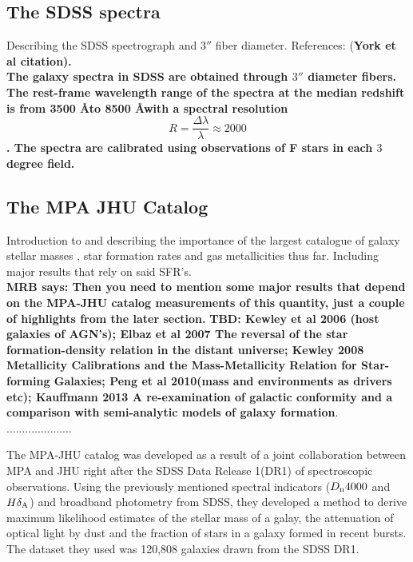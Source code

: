 \subsection{The SDSS spectra}
Describing the SDSS spectrograph and $3''$ fiber diameter. References: \citep{smee_multi-object_2013} (\bf York et al citation).\\
The galaxy spectra in SDSS are obtained through $3''$ diameter fibers. The rest-frame wavelength range of the spectra at the median redshift is from 3500 \AA to 8500 \AA with a spectral resolution $$R = \frac{\Delta \lambda}{\lambda} \approx 2000$$. The spectra are calibrated using observations of F stars in each $3$ degree field.

\subsection{The MPA JHU Catalog}
Introduction to and describing the importance of the largest catalogue of galaxy stellar masses \citep{kauffmann_stellar_2003}, star formation rates \citep{brinchmann_physical_2004} and gas metallicities \citep{tremonti_origin_2004} thus far. Including major results that rely on said SFR's.\\
{\bf MRB says: Then you need to mention some major results that depend
on the MPA-JHU catalog measurements of this quantity, just a couple of 
highlights from the later section. }{\bf TBD:  Kewley et al 2006 (host galaxies of AGN's); Elbaz et al 2007 The reversal of the star formation-density relation in the distant
universe; Kewley 2008 Metallicity Calibrations and the Mass-Metallicity Relation for Star-forming Galaxies; Peng et al 2010(mass and environments as drivers etc); Kauffmann 2013 A re-examination of galactic conformity and a comparison with semi-analytic models of galaxy formation}.\\
.....................

The MPA-JHU catalog was developed as a result of a joint collaboration between MPA and JHU right after the SDSS Data Release 1(DR1) of spectroscopic observations. Using the previously mentioned spectral indicators ($D_{\rm n}4000$ and $H\delta_{\rm A}$) and broadband photometry from SDSS, they developed a method to derive maximum likelihood estimates of the stellar mass of a galay, the attenuation of optical light by dust and the fraction of stars in a galaxy formed in recent bursts.  The dataset they used was 120,808 galaxies drawn from the SDSS DR1. 



